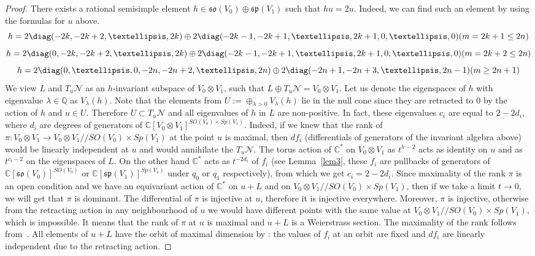 \documentclass[12pt]{amsart}
\theoremstyle{definition}
\theoremstyle{remark}
\numberwithin{equation}{subsection}
\begin{document}
\begin{proof}
  There exists a rational semisimple element $h\in \mathfrak{so}(V_0)\oplus \mathfrak{sp}(V_1)$ such that $hu=2u$. Indeed, we can find such an element by using the formulas for $u$ above.
\begin{equation}
    h=2 \diag(-2k,-2k+2,\dots , 2k) \oplus 2\diag(-2k-1,-2k+1,\dots, 2k+1,0,\dots, 0) (m=2k+1\le 2n)
\end{equation}
\begin{equation}
    h=2 \diag(0,-2k,-2k+2,\dots , 2k) \oplus 2\diag(-2k-1,-2k+1,\dots, 2k+1,0,\dots, 0) (m=2k+2\le 2n)
\end{equation}
\begin{equation}
    h=2 \diag(0,\dots,0,-2n,-2n+2,\dots , 2n) \oplus 2\diag(-2n+1,-2n+3,\dots, 2n-1) (m\ge 2n+1)
\end{equation}
We view $L$ and $T_u \mathcal{N}$ as an $h$-invariant subspace of $V_0\otimes V_1$, such that $L \oplus T_u \mathcal{N} = V_0 \otimes V_1$. Let us denote the eigenspaces of $h$ with eigenvalue $\lambda \in \mathbb{Q}$ as $V_{\lambda}(h)$. Note that the elements from $U:=\oplus_{\lambda>0} V_{\lambda}(h)$ lie in the null cone since they are retracted to $0$ by the action of $h$ and $u\in U$. Therefore $U\subset T_u \mathcal{N}$ and all eigenvalues of $h$ in $L$ are non-positive. In fact, these eigenvalues $c_i$ are equal to $2-2d_i$, where $d_i$ are degrees of generators of $\mathbb{C}[V_0\otimes V_1]^{SO(V_0)\times Sp(V_1)}$. Indeed, if we knew that the rank of $\pi\colon V_0 \otimes V_1 \rightarrow V_0 \otimes V_1/\!\!/SO(V_0)\times Sp(V_1)$ at the point $u$ is maximal, then $df_i$ (differentials of generators of the invariant algebra above) would be linearly independent at $u$ and would annihilate the $T_u\mathcal{N}$. The torus action of $\mathbb{C}^*$ on $V_0\otimes V_1$ as $t^{h-2}$ acts as identity on $u$ and as $t^{c_i-2}$ on the eigenspaces of $L$. On the other hand $\mathbb{C}^*$ acts as $t^{-2d_i}$ of $f_i$ (see Lemma~\ref{lem3}, these $f_i$ are pullbacks of generators of $\mathbb{C}[\mathfrak{so}(V_0)]^{SO(V_0)}$ or $\mathbb{C}[\mathfrak{sp}(V_1)]^{Sp(V_1)}$ under $q_0$ or $q_1$ respectively), from which we get $c_i=2-2d_i$. Since maximality of the rank $\pi$ is an open condition and we have an equivariant action of $\mathbb{C}^*$ on $u+L$ and on $V_0 \otimes V_1/\!\!/SO(V_0)\times Sp(V_1)$, then if we take a limit $t\rightarrow 0$, we will get that $\pi$ is dominant. The differential of $\pi$ is injective at $u$, therefore it is injective everywhere. Moreover, $\pi$ is injective, otherwise from the retracting action in any neighbourhood of $u$ we would have different points with the same value at $V_0 \otimes V_1/\!\!/SO(V_0)\times Sp(V_1)$, which is impossible. It means that the rank of $\pi$ at $u$ is maximal and $u+L$ is a Weierstrass section. The maximality of the rank follows from~\cite[Theorem 8.13]{PV}. All elements of $u+L$ have the orbit of maximal dimension by \cite[Proposition 8.12]{PV}: the values of $f_i$ at an orbit are fixed and $df_i$ are linearly independent due to
the retracting action.\end{proof}
\end{document}

